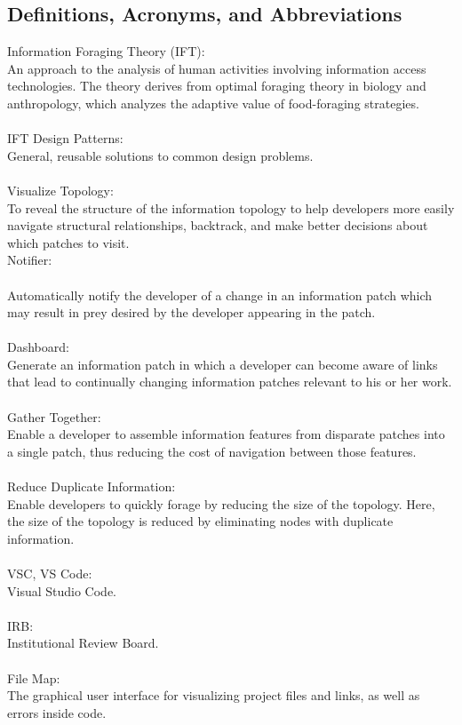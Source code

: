\documentclass[letterpaper,10pt,titlepage,draftclsnofoot,onecolumn] {IEEEtran}
\begin{document}
\subsection{Definitions, Acronyms, and Abbreviations}
Information Foraging Theory (IFT): \\
An approach to the analysis of human activities involving information access technologies. The theory derives from optimal foraging theory in biology and anthropology, which analyzes the adaptive value of food-foraging strategies.\\\\
IFT Design Patterns: \\
General, reusable solutions to common design problems.\\\\
Visualize Topology: \\
To reveal the structure of the information topology to help developers more easily navigate structural relationships, backtrack, and make better decisions about which patches to visit.\\
Notifier: \\\\
Automatically notify the developer of a change in an information patch which may result in prey desired by the developer appearing in the patch.\\\\
Dashboard: \\
Generate an information patch in which a developer can become aware of links that lead to continually changing information patches relevant to his or her work.\\\\
Gather Together: \\
Enable a developer to assemble information features from disparate patches into a single patch, thus reducing the cost of navigation between those features.\\\\
Reduce Duplicate Information: \\
Enable developers to quickly forage by reducing the size of the topology. Here, the size of the topology is reduced by eliminating nodes with duplicate information.\\\\
VSC, VS Code:\\
Visual Studio Code.\\\\
IRB: \\
Institutional Review Board.\\\\
File Map: \\
The graphical user interface for visualizing project files and links, as well as errors inside code.
\end{document}
